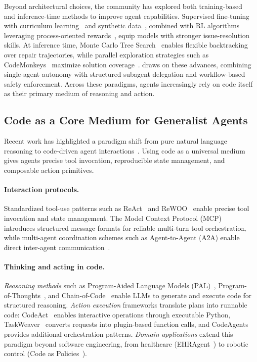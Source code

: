 Beyond architectural choices, the community has explored both training-based and inference-time methods to improve agent capabilities. Supervised fine-tuning with curriculum learning~\cite{curriculum_learning} and synthetic data~\cite{pham2025swe}, combined with RL algorithms leveraging process-oriented rewards~\cite{process_rewards}, equip models with stronger issue-resolution skills. At inference time, Monte Carlo Tree Search~\cite{mcts_planning} enables flexible backtracking over repair trajectories, while parallel exploration strategies such as CodeMonkeys~\cite{codemonkeys} maximize solution coverage~\cite{issue_resolution_survey}. \name draws on these advances, combining single-agent autonomy with structured subagent delegation and workflow-based safety enforcement. Across these paradigms, agents increasingly rely on code itself as their primary medium of reasoning and action.

\subsection{Code as a Core Medium for Generalist Agents}
Recent work has highlighted a paradigm shift from pure natural language reasoning to code-driven agent interactions~\cite{code_survey}. Using code as a universal medium gives agents precise tool invocation, reproducible state management, and composable action primitives.

\paragraph{Interaction protocols.} Standardized tool-use patterns such as ReAct~\cite{yao2023react} and ReWOO~\cite{xu2023rewoo} enable precise tool invocation and state management. The Model Context Protocol (MCP)~\cite{anthropic2024mcp} introduces structured message formats for reliable multi-turn tool orchestration, while multi-agent coordination schemes such as Agent-to-Agent (A2A) enable direct inter-agent communication~\cite{code_survey}.

\paragraph{Thinking and acting in code.} \emph{Reasoning methods} such as Program-Aided Language Models (PAL)~\cite{gao2023pal}, Program-of-Thoughts~\cite{code_survey}, and Chain-of-Code~\cite{code_survey} enable LLMs to generate and execute code for structured reasoning. \emph{Action execution} frameworks translate plans into runnable code: CodeAct~\cite{wang2024codeact} enables interactive operations through executable Python, TaskWeaver~\cite{qiao2023taskweaver} converts requests into plugin-based function calls, and CodeAgents~\cite{codeagents} provides additional orchestration patterns. \emph{Domain applications} extend this paradigm beyond software engineering, from healthcare (EHRAgent~\cite{ehragent}) to robotic control (Code as Policies~\cite{cap}).

